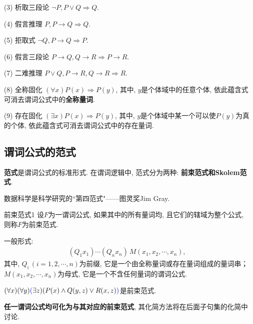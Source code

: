       (3) \textcolor[rgb]{0,0,1}{析取三段论}    $\neg P, P\vee Q \Rightarrow  Q$.

      (4) \textcolor[rgb]{0,0,1}{假言推理}       $ P, P\rightarrow Q \Rightarrow  Q$.

      (5) \textcolor[rgb]{0,0,1}{拒取式}           $ \neg Q,  P\rightarrow Q \Rightarrow  P$.

      (6) \textcolor[rgb]{0,0,1}{假言三段论}     $P\rightarrow Q,  Q\rightarrow R \Rightarrow P\rightarrow R$.

      (7) \textcolor[rgb]{0,0,1}{二难推理}       $ P\vee Q,  P\rightarrow R, Q\rightarrow R \Rightarrow  R$.

      (8) 全称固化        $(\forall x)P(x) \Rightarrow P(y)$, 其中, $y$是个体域中的任意个体, 依此蕴含式可消去谓词公式中的\textbf{全称量词}.

      (9) 存在固化 $(\exists x)P(x) \Rightarrow P(y)$, 其中, $y$是个体域中某一个可以使$P(y)$为真的个体, 依此蕴含式可消去谓词公式中的存在量词.
\subsection{谓词公式的范式}
\textbf{范式}是谓词公式的标准形式. 在谓词逻辑中, 范式分为两种: \textbf{前束范式和Skolem范式}.
\begin{remark}
  数据科学是科学研究的``第四范式"——图灵奖Jim Gray.
\end{remark}
\begin{mydef}{前束范式}{1}
设$F$为一谓词公式, 如果其中的所有量词均, 且它们的辖域为整个公式, 则称$F$为前束范式.

一般形式:
\begin{align}
  (Q_1 x_1)\cdots (Q_n x_n)\,M(x_1, x_2,\cdots, x_n),
\end{align}
其中, $Q_i\,(i=1,2,\cdots,n)$为前缀, 它是一个由全称量词或存在量词组成的量词串； $M(x_1,x_2,\cdots,x_n)$为母式, 它是一个不含任何量词的谓词公式.
\end{mydef}

\begin{example}
  $(\forall x) (\forall y) \textcolor[rgb]{0,0,1}{(}\exists z)(P(x)\wedge Q(y,z)\vee R(x,z)\textcolor[rgb]{0,0,1}{)}$是前束范式.
\end{example}

\textbf{任一谓词公式均可化为与其对应的前束范式}, 其化简方法将在后面子句集的化简中讨论.

